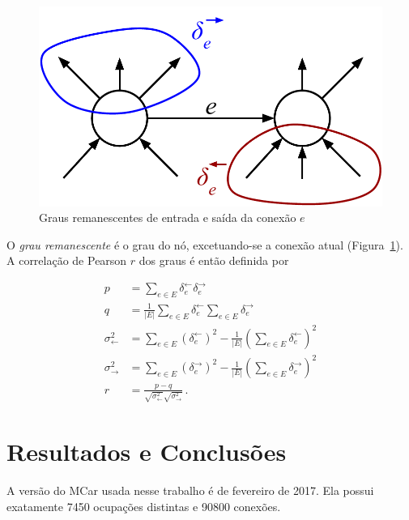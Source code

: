 \documentclass[
  article,
  11pt,
  a4paper,
  english,
  brazil,
  sumario=tradicional]{abntex2}
\begin{document}
\begin{figure}[ht]
    \centering
    \includegraphics[scale=0.4]{remaining-degree.pdf}
    \caption{Graus remanescentes de entrada e saída da conexão $e$}
    \label{fig:remaining-degree}
\end{figure}

O \textit{grau remanescente} é o grau do nó, excetuando-se a conexão atual (Figura~\ref{fig:remaining-degree}). A correlação de Pearson $r$ dos graus é então definida por

\begin{align*}
p &= \sum_{e \in E} \delta_e^\leftarrow \delta_e^\rightarrow
\\
q &= \frac{1}{|E|} \sum_{e \in E} \delta_e^\leftarrow
                                  \sum_{e \in E }\delta_e^\rightarrow
\\
\sigma^2_\leftarrow &= \sum_{e \in E} \left( \delta_e^\leftarrow \right)^2
            - \frac{1}{|E|} \left( \sum_{e \in E} \delta_e^\leftarrow \right)^2
\\
\sigma^2_\rightarrow &= \sum_{e \in E} \left( \delta_e^\rightarrow \right)^2
           - \frac{1}{|E|} \left( \sum_{e \in E} \delta_e^\rightarrow \right)^2
\\
r &= \frac{p - q}
                {\sqrt{ \sigma^2_\leftarrow } \sqrt{ \sigma^2_\rightarrow }}\,.
\end{align*}


\section{Resultados e Conclusões} \label{sec:resultados}


A versão do MCar usada nesse trabalho é de fevereiro de 2017. Ela possui exatamente 7450 ocupações distintas e 90800 conexões.
\end{document}
